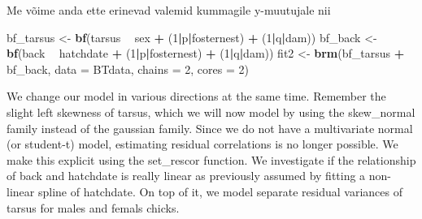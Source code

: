 \documentclass[]{book}
\newenvironment{Shaded}{\begin{snugshade}}{\end{snugshade}}
\newcommand{\KeywordTok}[1]{\textcolor[rgb]{0.13,0.29,0.53}{\textbf{#1}}}
\newcommand{\DataTypeTok}[1]{\textcolor[rgb]{0.13,0.29,0.53}{#1}}
\newcommand{\DecValTok}[1]{\textcolor[rgb]{0.00,0.00,0.81}{#1}}
\newcommand{\StringTok}[1]{\textcolor[rgb]{0.31,0.60,0.02}{#1}}
\newcommand{\OperatorTok}[1]{\textcolor[rgb]{0.81,0.36,0.00}{\textbf{#1}}}
\newcommand{\NormalTok}[1]{#1}
\begin{document}
Me võime anda ette erinevad valemid kummagile y-muutujale nii

\begin{Shaded}
\begin{Highlighting}[]
\NormalTok{bf_tarsus <-}\StringTok{ }\KeywordTok{bf}\NormalTok{(tarsus }\OperatorTok{~}\StringTok{ }\NormalTok{sex }\OperatorTok{+}\StringTok{ }\NormalTok{(}\DecValTok{1}\OperatorTok{|}\NormalTok{p}\OperatorTok{|}\NormalTok{fosternest) }\OperatorTok{+}\StringTok{ }\NormalTok{(}\DecValTok{1}\OperatorTok{|}\NormalTok{q}\OperatorTok{|}\NormalTok{dam))}
\NormalTok{bf_back <-}\StringTok{ }\KeywordTok{bf}\NormalTok{(back }\OperatorTok{~}\StringTok{ }\NormalTok{hatchdate }\OperatorTok{+}\StringTok{ }\NormalTok{(}\DecValTok{1}\OperatorTok{|}\NormalTok{p}\OperatorTok{|}\NormalTok{fosternest) }\OperatorTok{+}\StringTok{ }\NormalTok{(}\DecValTok{1}\OperatorTok{|}\NormalTok{q}\OperatorTok{|}\NormalTok{dam))}
\NormalTok{fit2 <-}\StringTok{ }\KeywordTok{brm}\NormalTok{(bf_tarsus }\OperatorTok{+}\StringTok{ }\NormalTok{bf_back, }\DataTypeTok{data =}\NormalTok{ BTdata, }\DataTypeTok{chains =} \DecValTok{2}\NormalTok{, }\DataTypeTok{cores =} \DecValTok{2}\NormalTok{)}
\end{Highlighting}
\end{Shaded}

We change our model in various directions at the same time. Remember the
slight left skewness of tarsus, which we will now model by using the
skew\_normal family instead of the gaussian family. Since we do not have
a multivariate normal (or student-t) model, estimating residual
correlations is no longer possible. We make this explicit using the
set\_rescor function. We investigate if the relationship of back and
hatchdate is really linear as previously assumed by fitting a non-linear
spline of hatchdate. On top of it, we model separate residual variances
of tarsus for males and femals chicks.
\end{document}
